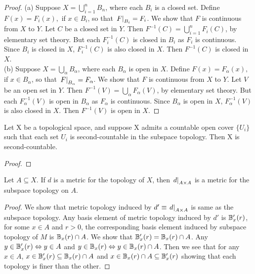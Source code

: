 \documentclass[11pt,a4paper]{article}
\begin{document}
\begin{proof}
(a) Suppose $X = \bigcup_{i=1}^n B_n$, where each $B_i$ is a closed set. Define $F(x) = F_i(x),$ if $x\in B_i$, so that $\left.F\right|_{B_i} = F_i$. We show that $F$ is continuous from $X$ to $Y$. Let $C$ be a closed set in $Y$. Then $F^{-1}(C) = \bigcup_{i=1}^n F_i(C)$, by elementary set theory. But each $F_i^{-1}(C)$ is closed in $B_i$ as $F_i$ is continuous. Since $B_i$ is closed in $X$, $F_i^{-1}(C)$ is also closed in $X$. Then $F^{-1}(C)$ is closed in $X$.
\\
(b) Suppose $X = \bigcup_\alpha B_\alpha$, where each $B_\alpha$ is open in $X$. Define $F(x) = F_\alpha(x),$ if $x\in B_\alpha$, so that $\left.F\right|_{B_\alpha} = F_\alpha$. We show that $F$ is continuous from $X$ to $Y$. Let $V$ be an open set in $Y$. Then $F^{-1}(V) = \bigcup_\alpha F_\alpha(V)$, by elementary set theory. But each $F_\alpha^{-1}(V)$ is open in $B_\alpha$ as $F_\alpha$ is continuous. Since $B_\alpha$ is open in $X$, $F_\alpha^{-1}(V)$ is also closed in $X$. Then $F^{-1}(V)$ is open in $X$.
\end{proof}

\begin{prop}
    Let X be a topological space, and suppose X admits a countable open cover $\{U_i\}$ such that each set $U_i$ is second-countable in the subspace topology. Then X is second-countable.
\end{prop}

\begin{proof}
    
\end{proof}

\begin{prop}
Let $A\subseteq X$. If $d$ is a metric for the topology of $X$, then $\left.d\right|_{A\times A}$ is a metric for the subspace topology on $A$.
\end{prop}

\begin{proof}
We show that metric topology induced by $d'\equiv \left.d\right|_{A\times A}$ is same as the subspace topology. Any basis element of metric topology induced by $d'$ is $\mathbb{B}'_x(r)$, for some $x\in A$ and $r>0$, the corresponding basis element induced by subspace topology of $M$ is $\mathbb{B}_x(r)\cap A$. We show that $\mathbb{B}'_x(r) = \mathbb{B}_x(r)\cap A$. Any $y\in \mathbb{B}'_x(r) \Leftrightarrow y\in A$ and $y\in \mathbb{B}_x(r) \Leftrightarrow y\in \mathbb{B}_x(r)\cap A$. Then we see that for any $x\in A$, $x\in \mathbb{B}'_x(r)\subseteq \mathbb{B}_x(r)\cap A$ and $x\in \mathbb{B}_x(r)\cap A\subseteq \mathbb{B}'_x(r)$ showing that each topology is finer than the other.
\end{proof}
\end{document}
